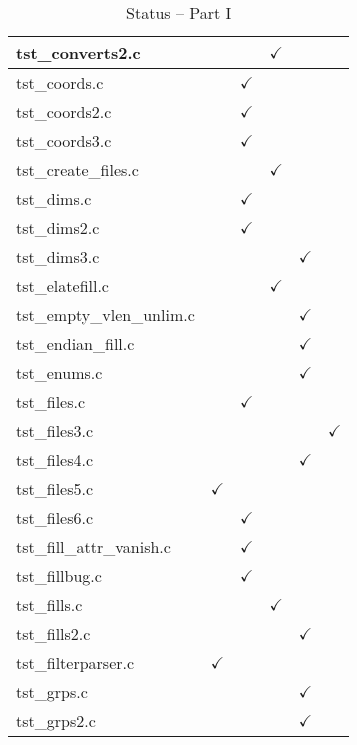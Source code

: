\begin{table}[H]
\begin{tabular}{|l|c|c|c|c|c|}
tst\_converts2.c  &   &   & $\checkmark$  &   &   \\ \hline
tst\_coords.c     &   & $\checkmark$  &   &   &   \\ \hline
tst\_coords2.c    &   & $\checkmark$  &   &   &   \\ \hline
tst\_coords3.c    &   & $\checkmark$  &   &   &   \\ \hline
tst\_create\_files.c   &   &   & $\checkmark$  &   &   \\ \hline
tst\_dims.c       &   & $\checkmark$  &   &   &   \\ \hline
tst\_dims2.c      &   & $\checkmark$  &   &   &   \\ \hline
tst\_dims3.c      &   &   &   & $\checkmark$  &   \\ \hline
tst\_elatefill.c  &   &   & $\checkmark$  &   &   \\ \hline
tst\_empty\_vlen\_unlim.c   &   &   &   & $\checkmark$  &   \\ \hline
tst\_endian\_fill.c   &   &   &   & $\checkmark$  &   \\ \hline
tst\_enums.c   &   &   &   &  $\checkmark$ &   \\ \hline
tst\_files.c   &   & $\checkmark$  &   &   &   \\ \hline
tst\_files3.c   &   &   &   &   &  $\checkmark$ \\ \hline
tst\_files4.c   &   &   &   & $\checkmark$  &   \\ \hline
tst\_files5.c   & $\checkmark$  &   &   &   &   \\ \hline
tst\_files6.c   &   & $\checkmark$  &   &   &   \\ \hline
tst\_fill\_attr\_vanish.c   &   & $\checkmark$  &   &   &   \\ \hline
tst\_fillbug.c   &   & $\checkmark$  &   &   &   \\ \hline
tst\_fills.c   &   &   &  $\checkmark$ &   &   \\ \hline
tst\_fills2.c   &   &   &   & $\checkmark$  &   \\ \hline
tst\_filterparser.c   & $\checkmark$  &   &   &   &   \\ \hline
tst\_grps.c   &   &   &   &  $\checkmark$ &   \\ \hline
tst\_grps2.c   &   &   &   & $\checkmark$  &   \\ \hline
\hline
\end{tabular}
\caption{Status -- Part I}
\end{table}

\clearpage

